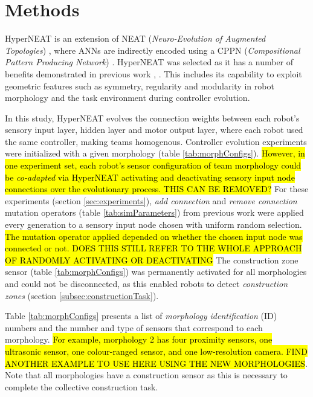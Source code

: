 \section{Methods}

HyperNEAT \cite{StanleyDAmbrosioGauci2009} is an extension of NEAT (\textit{Neuro-Evolution of Augmented Topologies})
\cite{StanleyMiikkulainen2002}, where ANNs are indirectly encoded using a CPPN (\textit{Compositional Pattern Producing Network})
\cite{Stanley2007}.
HyperNEAT was selected as it has a number of benefits demonstrated in previous work \cite{DAmbrosio2013},
\cite{WatsonNitschke2015SSCI}.
This includes its capability to exploit geometric features such as symmetry, regularity and modularity
in robot morphology and the task environment during controller evolution.

In this study, HyperNEAT evolves the connection weights between each robot's sensory input layer,
hidden layer and motor output layer, where each robot used the same controller, making teams
homogenous.
Controller evolution experiments were initialized with a given morphology (table \ref{tab:morphConfigs}).
\hl{However, in one experiment set, each robot's sensor configuration of team morphology could be
\textit{co-adapted} via HyperNEAT activating and deactivating sensory input node connections over
the evolutionary process. THIS CAN BE REMOVED?}
For these experiments (section \ref{sec:experiments}), \textit{add connection} and
\textit{remove connection} mutation operators (table \ref{tab:simParameters}) from previous work
\cite{HewlandNitschke2015} were applied every generation to a sensory input node
chosen with uniform random selection.  \hl{The mutation operator applied depended on whether the chosen input
node was connected or not. DOES THIS STILL REFER TO THE WHOLE APPROACH OF RANDOMLY ACTIVATING OR DEACTIVATING}  The construction zone sensor (table \ref{tab:morphConfigs}) was permanently activated
for all morphologies and could not be disconnected, as this enabled robots to detect \textit{construction zones}
(section \ref{subsec:constructionTask}).

Table \ref{tab:morphConfigs} presents a list of \textit{morphology identification} (ID) numbers and the
number and type of sensors that correspond to each morphology.
\hl{For example, morphology 2 has four proximity sensors, one ultrasonic sensor, one colour-ranged sensor, and
one low-resolution camera. FIND ANOTHER EXAMPLE TO USE HERE USING THE NEW MORPHOLOGIES}.
Note that all morphologies have a construction sensor as this is necessary to complete the collective construction task.

